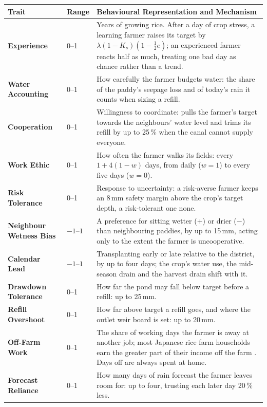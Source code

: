 \documentclass{article}
\begin{document}
\begin{changed}
\medskip
\small
\begin{tabular}{|p{3.1cm}|p{1.2cm}|p{12cm}|}
\hline
\rowcolor[HTML]{F8F319}
\textbf{Trait} & \textbf{Range} & \textbf{Behavioural Representation and Mechanism} \\ \hline
\textbf{Experience} & 0--1 & Years of growing rice. After a day of crop stress, a learning farmer raises its target by $\lambda(1-K_s)(1-\tfrac{1}{2}e)$; an experienced farmer reacts half as much, treating one bad day as chance rather than a trend. \\ \hline
\textbf{Water Accounting} & 0--1 & How carefully the farmer budgets water: the share of the paddy's seepage loss and of today's rain it counts when sizing a refill. \\ \hline
\textbf{Cooperation} & 0--1 & Willingness to coordinate: pulls the farmer's target towards the neighbours' water level and trims its refill by up to 25\,\% when the canal cannot supply everyone. \\ \hline
\textbf{Work Ethic} & 0--1 & How often the farmer walks its fields: every $1+4(1-w)$ days, from daily ($w=1$) to every five days ($w=0$). \\ \hline
\textbf{Risk Tolerance} & 0--1 & Response to uncertainty: a risk-averse farmer keeps an 8\,mm safety margin above the crop's target depth, a risk-tolerant one none. \\ \hline
\textbf{Neighbour Wetness Bias} & $-1$--$1$ & A preference for sitting wetter ($+$) or drier ($-$) than neighbouring paddies, by up to 15\,mm, acting only to the extent the farmer is uncooperative. \\ \hline
\textbf{Calendar Lead} & $-1$--$1$ & Transplanting early or late relative to the district, by up to four days; the crop's water use, the mid-season drain and the harvest drain shift with it. \\ \hline
\textbf{Drawdown Tolerance} & 0--1 & How far the pond may fall below target before a refill: up to 25\,mm. \\ \hline
\textbf{Refill Overshoot} & 0--1 & How far above target a refill goes, and where the outlet weir board is set: up to 20\,mm. \\ \hline
\textbf{Off-Farm Work} & 0--1 & The share of working days the farmer is away at another job; most Japanese rice farm households earn the greater part of their income off the farm \citep{OECD2019Japan}. Days off are always spent at home. \\ \hline
\textbf{Forecast Reliance} & 0--1 & How many days of rain forecast the farmer leaves room for: up to four, trusting each later day 20\,\% less. \\ \hline

\end{tabular}
\end{changed}
\end{document}
